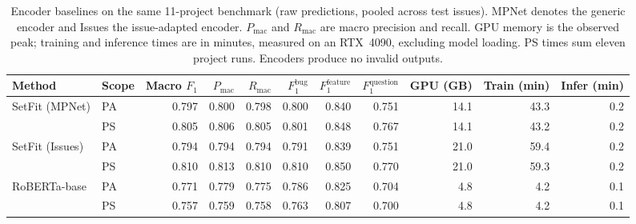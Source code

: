 \begin{table}[!t]
  \centering\color{coauthorcolor}
  \caption{Encoder baselines on the same 11-project benchmark (raw predictions, pooled across test issues). MPNet denotes the generic encoder and Issues the issue-adapted encoder. $P_{\mathrm{mac}}$ and $R_{\mathrm{mac}}$ are macro precision and recall. GPU memory is the observed peak; training and inference times are in minutes, measured on an RTX~4090, excluding model loading. PS times sum eleven project runs. Encoders produce no invalid outputs.}
  \label{tab:encoder-baselines}
  \footnotesize
  \setlength{\tabcolsep}{4pt}
  \begin{tabular}{llrrrrrrrrr}
    \toprule
    Method & Scope & Macro $F_1$ & $P_{\mathrm{mac}}$ & $R_{\mathrm{mac}}$ & $F_1^{\mathrm{bug}}$ & $F_1^{\mathrm{feature}}$ & $F_1^{\mathrm{question}}$ & GPU (GB) & Train (min) & Infer (min) \\
    \midrule
    SetFit (MPNet) & PA & 0.797 & 0.800 & 0.798 & 0.800 & 0.840 & 0.751 & 14.1 & 43.3 & 0.2 \\
     & PS & 0.805 & 0.806 & 0.805 & 0.801 & 0.848 & 0.767 & 14.1 & 43.2 & 0.2 \\
    \addlinespace[2pt]
    SetFit (Issues) & PA & 0.794 & 0.794 & 0.794 & 0.791 & 0.839 & 0.751 & 21.0 & 59.4 & 0.2 \\
     & PS & 0.810 & 0.813 & 0.810 & 0.810 & 0.850 & 0.770 & 21.0 & 59.3 & 0.2 \\
    \addlinespace[2pt]
    RoBERTa-base & PA & 0.771 & 0.779 & 0.775 & 0.786 & 0.825 & 0.704 & 4.8 & 4.2 & 0.1 \\
     & PS & 0.757 & 0.759 & 0.758 & 0.763 & 0.807 & 0.700 & 4.8 & 4.2 & 0.1 \\
    \bottomrule
  \end{tabular}
\end{table}
